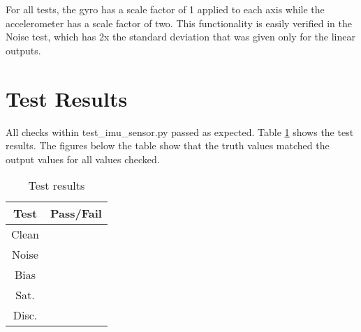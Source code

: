 For all tests, the gyro has a scale factor of 1 applied to each axis while the accelerometer has a scale factor of two. This functionality is easily verified in the Noise test, which has 2x the standard deviation that was given only for the linear outputs.


\section{Test Results}
All checks within test\_imu\_sensor.py passed as expected. Table \ref{tab:results} shows the test results. The figures below the table show that the truth values matched the output values for all values checked.

\begin{table}[H]
	\caption{Test results}
	\label{tab:results}
	\centering \fontsize{10}{10}\selectfont
	\begin{tabular}{c | c  } %
		\hline
		\textbf{Test} 						  		&\textbf{Pass/Fail} \\ \hline
		Clean	   			&  \\ \hline
		Noise	   			&  \\ \hline
		Bias	   			&  \\ \hline
		Sat.	   			&  \\ \hline
		Disc.	   			&  \\ \hline
	\end{tabular}
\end{table}







\clearpage






\clearpage






\clearpage






\clearpage






\clearpage






\pagebreak %